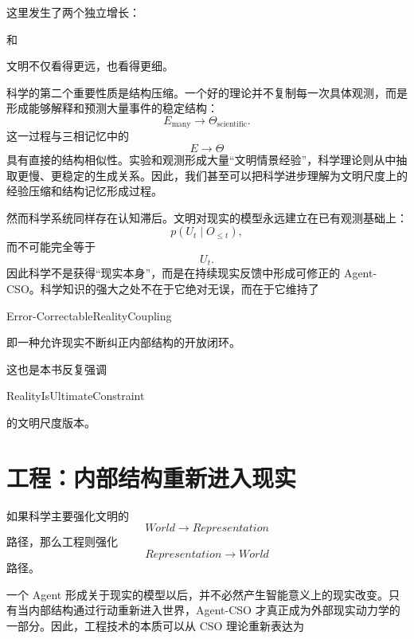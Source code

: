 这里发生了两个独立增长：

\begin{statementbox}
\centering
{}
\end{statementbox}

和

\begin{statementbox}
\centering
{}
\end{statementbox}

文明不仅看得更远，也看得更细。

科学的第二个重要性质是结构压缩。一个好的理论并不复制每一次具体观测，而是形成能够解释和预测大量事件的稳定结构：
\[
E_{\mathrm{many}}
\rightarrow
\Theta_{\mathrm{scientific}}.
\]
这一过程与三相记忆中的
\[
E\rightarrow\Theta
\]
具有直接的结构相似性。实验和观测形成大量“文明情景经验”，科学理论则从中抽取更慢、更稳定的生成关系。因此，我们甚至可以把科学进步理解为文明尺度上的经验压缩和结构记忆形成过程。

然而科学系统同样存在认知滞后。文明对现实的模型永远建立在已有观测基础上：
\[
p(
U_t
\mid
O_{\leq t}
),
\]
而不可能完全等于
\[
U_t.
\]
因此科学不是获得“现实本身”，而是在持续现实反馈中形成可修正的 Agent-CSO。科学知识的强大之处不在于它绝对无误，而在于它维持了
\begin{statementbox}
Error-CorrectableRealityCoupling
\end{statementbox}
即一种允许现实不断纠正内部结构的开放闭环。

这也是本书反复强调
\begin{statementbox}
RealityIsUltimateConstraint
\end{statementbox}
的文明尺度版本。


\section{工程：内部结构重新进入现实}

如果科学主要强化文明的
\[
World\rightarrow Representation
\]
路径，那么工程则强化
\[
Representation\rightarrow World
\]
路径。

一个 Agent 形成关于现实的模型以后，并不必然产生智能意义上的现实改变。只有当内部结构通过行动重新进入世界，Agent-CSO 才真正成为外部现实动力学的一部分。因此，工程技术的本质可以从 CSO 理论重新表达为
\begin{statementbox}
\centering
{}
\end{statementbox}

